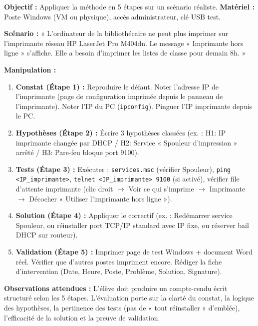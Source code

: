 \documentclass[11pt]{article}
\begin{document}
\begin{experience}
\textbf{Objectif :} Appliquer la méthode en 5 étapes sur un scénario réaliste.
\textbf{Matériel :} Poste Windows (VM ou physique), accès administrateur, clé USB test.

\textbf{Scénario :} « L'ordinateur de la bibliothécaire ne peut plus imprimer sur l'imprimante réseau HP LaserJet Pro M404dn. Le message « Imprimante hors ligne » s'affiche. Elle a besoin d'imprimer les listes de classe pour demain 8h. »

\textbf{Manipulation :}
\begin{enumerate}
    \item \textbf{Constat (Étape 1) :} Reproduire le défaut. Noter l'adresse IP de l'imprimante (page de configuration imprimée depuis le panneau de l'imprimante). Noter l'IP du PC (\texttt{ipconfig}). Pinguer l'IP imprimante depuis le PC.
    \item \textbf{Hypothèses (Étape 2) :} Écrire 3 hypothèses classées (ex. : H1: IP imprimante changée par DHCP / H2: Service « Spouleur d'impression » arrêté / H3: Pare-feu bloque port 9100).
    \item \textbf{Tests (Étape 3) :} Exécuter : \texttt{services.msc} (vérifier Spouleur), \texttt{ping <IP\_imprimante>}, \texttt{telnet <IP\_imprimante> 9100} (si activé), vérifier file d'attente imprimante (clic droit $\to$ Voir ce qui s'imprime $\to$ Imprimante $\to$ Décocher « Utiliser l'imprimante hors ligne »).
    \item \textbf{Solution (Étape 4) :} Appliquer le correctif (ex. : Redémarrer service Spouleur, ou réinstaller port TCP/IP standard avec IP fixe, ou réserver bail DHCP sur routeur).
    \item \textbf{Validation (Étape 5) :} Imprimer page de test Windows + document Word réel. Vérifier que d'autres postes impriment encore. Rédiger la fiche d'intervention (Date, Heure, Poste, Problème, Solution, Signature).
\end{enumerate}

\textbf{Observations attendues :} L'élève doit produire un compte-rendu écrit structuré selon les 5 étapes. L'évaluation porte sur la clarté du constat, la logique des hypothèses, la pertinence des tests (pas de « tout réinstaller » d'emblée), l'efficacité de la solution et la preuve de validation.
\end{experience}
\end{document}
